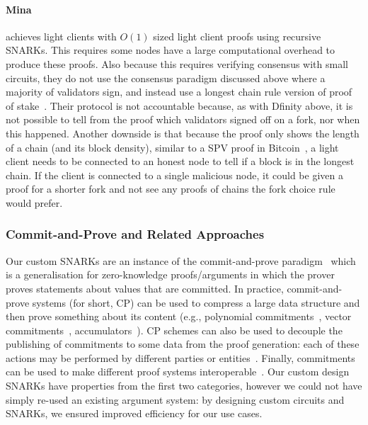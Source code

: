 \paragraph{Mina} achieves light clients with $O(1)$ sized light client proofs using recursive SNARKs. This requires some nodes have a large 
computational overhead to produce these proofs. Also because this requires verifying consensus with small circuits, they do not use the consensus paradigm 
discussed above where a majority of validators sign, and instead use a longest chain rule version of proof of stake~\cite{mina}. 
Their protocol is not accountable because, as with Dfinity above, it is not possible to tell from the proof which validators signed off on a fork, nor when this happened. 
Another downside is that because the proof only shows the length of a chain (and its block density), similar to a SPV proof in Bitcoin~\cite{bitcoin}, a light client needs to be connected to an 
honest node to tell if a block is in the longest chain. If the client is connected to a single malicious node, it could be given a proof for a shorter fork and not see any proofs of chains the fork choice rule would prefer.
\subsubsection{Commit-and-Prove and Related Approaches}
\label{sec:commit_prove}

\noindent Our custom SNARKs are an instance of the commit-and-prove paradigm~\cite{KilianPhD,CLOS02,CP_proposal,HP_paper} 
which is a generalisation for zero-knowledge proofs/arguments in which the prover proves statements about values that are committed. 
In practice, commit-and-prove systems (for short, CP) can be used to compress a large data structure and then prove something about its content 
(e.g., polynomial commitments~\cite{KZG_10}, vector commitments~\cite{vector_commitment_1}, accumulators~\cite{first_accumulator}). CP schemes 
can also be used to decouple the publishing of commitments to some data from the proof generation: each of these actions may be performed by different 
parties or entities~\cite{zkp_reference}. Finally, commitments can be used to make different proof systems interoperable~\cite{CP_paper,interoperability_2}. 
Our custom design SNARKs have properties from the first two categories, however we could not have simply re-used an existing argument system: by 
designing custom circuits and SNARKs, we ensured improved efficiency for our use cases. \\


